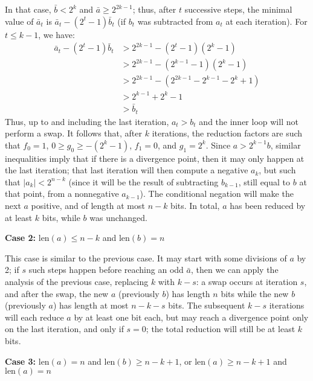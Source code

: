 \documentclass{llncs}
\newcommand{\bitlength}{\text{len}}
\begin{document}
In that case, $\bar b < 2^k$ and $\bar a \geq 2^{2k - 1}$; thus,
after $t$ successive steps, the minimal value of $\bar a_t$ is
$\bar a_t - (2^t - 1)\bar b_t$ (if $b_t$ was subtracted from $a_t$ at
each iteration). For $t \leq k-1$, we have:
\begin{align*}
    \bar a_t - (2^t - 1) \bar b_t &> 2^{2k - 1} - (2^t - 1) (2^k - 1) \\
        &> 2^{2k - 1} - (2^{k - 1} - 1) (2^k - 1) \\
        &> 2^{2k - 1} - (2^{2k - 1} - 2^{k - 1} - 2^k + 1) \\
        &> 2^{k - 1} + 2^k - 1 \\
        &> \bar b_t
\end{align*}
Thus, up to and including the last iteration, $a_t > b_t$ and the inner
loop will not perform a swap. It follows that, after $k$ iterations, the
reduction factors are such that $f_0 = 1$, $0\geq g_0\geq -(2^k-1)$,
$f_1 = 0$, and $g_1 = 2^k$. Since $a > 2^{k-1} b$, similar inequalities
imply that if there is a divergence point, then it may only happen at
the last iteration; that last iteration will then compute a negative
$a_k$, but such that $|a_k| < 2^{n-k}$ (since it will be the result of
subtracting $b_{k-1}$, still equal to $b$ at that point, from a
nonnegative $a_{k-1}$). The conditional negation will make the next $a$
positive, and of length at most $n-k$ bits. In total, $a$ has been reduced
by at least $k$ bits, while $b$ was unchanged.

\vspace{2ex}
\noindent\textsf{\textbf{Case 2:}} $\bitlength(a) \leq n-k$ and
$\bitlength(b) = n$

This case is similar to the previous case. It may start with some
divisions of $a$ by 2; if $s$ such steps happen before reaching an odd
$\bar a$, then we can apply the analysis of the previous case, replacing
$k$ with $k-s$: a swap occurs at iteration $s$, and after the swap,
the new $a$ (previously $b$) has length $n$ bits while the new $b$
(previously $a$) has length at most $n-k-s$ bits. The subsequent
$k-s$ iterations will each reduce $a$ by at least one bit each, but
may reach a divergence point only on the last iteration, and only if
$s = 0$; the total reduction will still be at least $k$ bits.

\vspace{2ex}
\noindent\textsf{\textbf{Case 3:}} $\bitlength(a) = n$ and
$\bitlength(b) \geq n - k + 1$, or $\bitlength(a) \geq n - k + 1$
and $\bitlength(a) = n$
\end{document}
